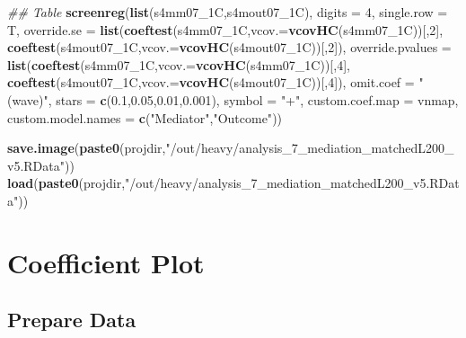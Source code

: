 \documentclass[
]{article}
\newenvironment{Shaded}{\begin{snugshade}}{\end{snugshade}}
\newcommand{\CommentTok}[1]{\textcolor[rgb]{0.56,0.35,0.01}{\textit{#1}}}
\newcommand{\DataTypeTok}[1]{\textcolor[rgb]{0.13,0.29,0.53}{#1}}
\newcommand{\DecValTok}[1]{\textcolor[rgb]{0.00,0.00,0.81}{#1}}
\newcommand{\FloatTok}[1]{\textcolor[rgb]{0.00,0.00,0.81}{#1}}
\newcommand{\KeywordTok}[1]{\textcolor[rgb]{0.13,0.29,0.53}{\textbf{#1}}}
\newcommand{\NormalTok}[1]{#1}
\newcommand{\StringTok}[1]{\textcolor[rgb]{0.31,0.60,0.02}{#1}}
\begin{document}
\begin{Shaded}
\begin{Highlighting}[]
\CommentTok{## Table}
\KeywordTok{screenreg}\NormalTok{(}\KeywordTok{list}\NormalTok{(s4mm07_1C,s4mout07_1C), }\DataTypeTok{digits =} \DecValTok{4}\NormalTok{, }\DataTypeTok{single.row =}\NormalTok{ T,}
          \DataTypeTok{override.se =} \KeywordTok{list}\NormalTok{(}\KeywordTok{coeftest}\NormalTok{(s4mm07_1C,}\DataTypeTok{vcov.=}\KeywordTok{vcovHC}\NormalTok{(s4mm07_1C))[,}\DecValTok{2}\NormalTok{],}
                             \KeywordTok{coeftest}\NormalTok{(s4mout07_1C,}\DataTypeTok{vcov.=}\KeywordTok{vcovHC}\NormalTok{(s4mout07_1C))[,}\DecValTok{2}\NormalTok{]),}
          \DataTypeTok{override.pvalues =} \KeywordTok{list}\NormalTok{(}\KeywordTok{coeftest}\NormalTok{(s4mm07_1C,}\DataTypeTok{vcov.=}\KeywordTok{vcovHC}\NormalTok{(s4mm07_1C))[,}\DecValTok{4}\NormalTok{],}
                                  \KeywordTok{coeftest}\NormalTok{(s4mout07_1C,}\DataTypeTok{vcov.=}\KeywordTok{vcovHC}\NormalTok{(s4mout07_1C))[,}\DecValTok{4}\NormalTok{]),}
          \DataTypeTok{omit.coef =} \StringTok{"(wave)"}\NormalTok{, }\DataTypeTok{stars =} \KeywordTok{c}\NormalTok{(}\FloatTok{0.1}\NormalTok{,}\FloatTok{0.05}\NormalTok{,}\FloatTok{0.01}\NormalTok{,}\FloatTok{0.001}\NormalTok{), }\DataTypeTok{symbol =} \StringTok{"+"}\NormalTok{,}
          \DataTypeTok{custom.coef.map =}\NormalTok{ vnmap, }
          \DataTypeTok{custom.model.names =} \KeywordTok{c}\NormalTok{(}\StringTok{"Mediator"}\NormalTok{,}\StringTok{"Outcome"}\NormalTok{))}
\end{Highlighting}
\end{Shaded}

\begin{Shaded}
\begin{Highlighting}[]
\KeywordTok{save.image}\NormalTok{(}\KeywordTok{paste0}\NormalTok{(projdir,}\StringTok{"/out/heavy/analysis_7_mediation_matchedL200_v5.RData"}\NormalTok{))}
\KeywordTok{load}\NormalTok{(}\KeywordTok{paste0}\NormalTok{(projdir,}\StringTok{"/out/heavy/analysis_7_mediation_matchedL200_v5.RData"}\NormalTok{))}
\end{Highlighting}
\end{Shaded}

\hypertarget{coefficient-plot}{%
\section{Coefficient Plot}\label{coefficient-plot}}

\hypertarget{prepare-data}{%
\subsection{Prepare Data}\label{prepare-data}}
\end{document}
